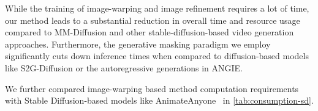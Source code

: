While the training of image-warping and image refinement requires a lot of time, our method leads to a substantial reduction in overall time and resource usage compared to MM-Diffusion and other stable-diffusion-based video generation approaches. Furthermore, the generative masking paradigm we employ significantly cuts down inference times when compared to diffusion-based models like S2G-Diffusion or the autoregressive generations in ANGIE.

We further compared image-warping based method computation requirements with Stable Diffusion-based models like AnimateAnyone~\cite{hu2023animateanyone} in \cref{tab:consumption-sd}. 


\begin{table}[!ht]
\centering

\caption{\small{\textbf{Time consumption comparison} of training (1 NVIDIA A100 GPU) and inference (1 NVIDIA GeForce RTX A6000 GPU).}}
\label{tab:consumption}
\end{table}




